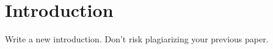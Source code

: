 \section{Introduction}
\label{sec:intro}

Write a new introduction. Don't risk plagiarizing your previous paper.
